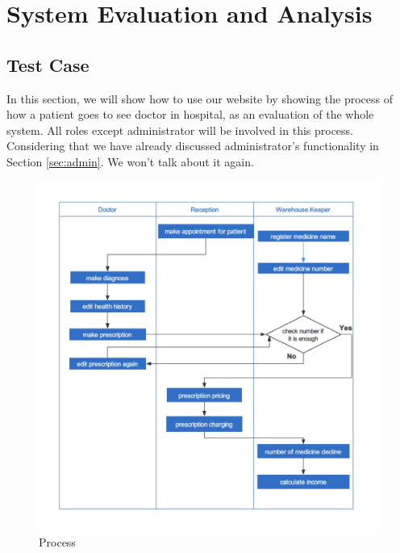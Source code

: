 \section{System Evaluation and Analysis}

\subsection{Test Case}
In this section, we will show how to use our website by showing the process of how a patient goes to see doctor in hospital, as an evaluation of the whole system. All roles except administrator will be involved in this process. Considering that we have already discussed administrator’s functionality in Section \ref{sec:admin}. We won’t talk about it again.
\begin{figure}[H]
    \centering
    \includegraphics[width=\textwidth]{pp/pp1.jpg}
    \caption{Process}
    \label{fig:pp1}
\end{figure}
